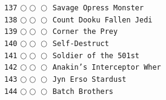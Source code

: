 \documentclass[a4paper,landscape]{article}
\begin{document}
\begin{multicols*}{5}
\texttt{137} \(\bigcirc\!\bigcirc\!\bigcirc\)  \texttt{Savage Opress Monster} \vspace{-0.3mm}\\ 
\texttt{138} \(\bigcirc\!\bigcirc\!\bigcirc\)  \texttt{Count Dooku Fallen Jedi} \vspace{-0.3mm}\\ 
\texttt{139} \(\bigcirc\!\bigcirc\!\bigcirc\)  \texttt{Corner the Prey} \vspace{-0.3mm}\\ 
\texttt{140} \(\bigcirc\!\bigcirc\!\bigcirc\)  \texttt{Self-Destruct} \vspace{-0.3mm}\\ 
\texttt{141} \(\bigcirc\!\bigcirc\!\bigcirc\)  \texttt{Soldier of the 501st} \vspace{-0.3mm}\\ 
\texttt{142} \(\bigcirc\!\bigcirc\!\bigcirc\)  \texttt{Anakin's Interceptor Wher} \vspace{-0.3mm}\\ 
\texttt{143} \(\bigcirc\!\bigcirc\!\bigcirc\)  \texttt{Jyn Erso Stardust} \vspace{-0.3mm}\\ 
\texttt{144} \(\bigcirc\!\bigcirc\!\bigcirc\)  \texttt{Batch Brothers} \vspace{-0.3mm}\\ 

\end{multicols*}
\end{document}
